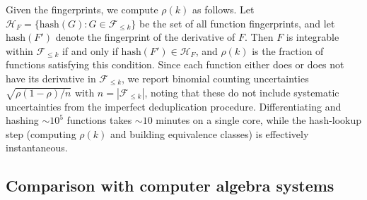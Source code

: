 \documentclass[preprint,12pt,authoryear]{elsarticle}
\newcommand{\Fleq}{\mathcal{F}_{\leq k}}
\newcommand{\rhok}{\rho(k)}
\newcommand{\hd}[1]{{\color{red}\textbf{[HD: #1]}}}
\begin{document}
Given the fingerprints, we compute $\rhok$ as follows. Let $\mathcal{H}_F = \{\mathrm{hash}(G) : G \in \Fleq\}$ be the set of all function fingerprints, and let $\mathrm{hash}(F')$ denote the fingerprint of the derivative of $F$. Then $F$ is integrable within $\Fleq$ if and only if $\mathrm{hash}(F') \in \mathcal{H}_F$, and $\rhok$ is the fraction of functions satisfying this condition. %
Since each function either does or does not have its derivative in $\Fleq$, we report binomial counting uncertainties $\sqrt{\rho(1-\rho)/n}$ with $n = |\Fleq|$, noting that these do not include systematic uncertainties from the imperfect deduplication procedure. Differentiating and hashing $\sim 10^5$ functions takes $\sim 10$ minutes on a single core, while the hash-lookup step (computing $\rhok$ and building equivalence classes) is effectively instantaneous.

\subsection{Comparison with computer algebra systems}
\label{sec:cas_method}
\end{document}
